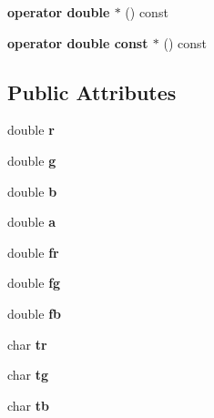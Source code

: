 \begin{DoxyCompactItemize}
\item 
\hypertarget{classmath_1_1color_a510d0999c7cfa43c544221a547cd71a3}{
{\bfseries operator double $\ast$} () const }
\label{classmath_1_1color_a510d0999c7cfa43c544221a547cd71a3}

\item 
\hypertarget{classmath_1_1color_afb78c46fda02afd684c7a08ecbd3005f}{
{\bfseries operator double const $\ast$} () const }
\label{classmath_1_1color_afb78c46fda02afd684c7a08ecbd3005f}

\end{DoxyCompactItemize}
\subsection*{Public Attributes}
\begin{DoxyCompactItemize}
\item 
\hypertarget{classmath_1_1color_a70b4e3b2076ac575c9f0fd5675df96b9}{
double {\bfseries r}}
\label{classmath_1_1color_a70b4e3b2076ac575c9f0fd5675df96b9}

\item 
\hypertarget{classmath_1_1color_afd24432aa0fdaa21f16a5c0aaa4f7c15}{
double {\bfseries g}}
\label{classmath_1_1color_afd24432aa0fdaa21f16a5c0aaa4f7c15}

\item 
\hypertarget{classmath_1_1color_a91409724fd16c499eafeaa054359b36e}{
double {\bfseries b}}
\label{classmath_1_1color_a91409724fd16c499eafeaa054359b36e}

\item 
\hypertarget{classmath_1_1color_af9641bfedd24fdca127a048cc07c095b}{
double {\bfseries a}}
\label{classmath_1_1color_af9641bfedd24fdca127a048cc07c095b}

\item 
\hypertarget{classmath_1_1color_a57917be0bfc64fce649bf6b500cc9daf}{
double {\bfseries fr}}
\label{classmath_1_1color_a57917be0bfc64fce649bf6b500cc9daf}

\item 
\hypertarget{classmath_1_1color_af0496bb10fbf9ecf6975609189528877}{
double {\bfseries fg}}
\label{classmath_1_1color_af0496bb10fbf9ecf6975609189528877}

\item 
\hypertarget{classmath_1_1color_aa1e2544e4da80521af6d5793273efda0}{
double {\bfseries fb}}
\label{classmath_1_1color_aa1e2544e4da80521af6d5793273efda0}

\item 
\hypertarget{classmath_1_1color_ad3e7415b7e4abeb8e896891cd9c138f6}{
char {\bfseries tr}}
\label{classmath_1_1color_ad3e7415b7e4abeb8e896891cd9c138f6}

\item 
\hypertarget{classmath_1_1color_a1246dfe8c8411d820a6d431cce8c7ca9}{
char {\bfseries tg}}
\label{classmath_1_1color_a1246dfe8c8411d820a6d431cce8c7ca9}

\item 
\hypertarget{classmath_1_1color_a093ac45e767fa6a162b46100a56ed71c}{
char {\bfseries tb}}
\label{classmath_1_1color_a093ac45e767fa6a162b46100a56ed71c}

\end{DoxyCompactItemize}
